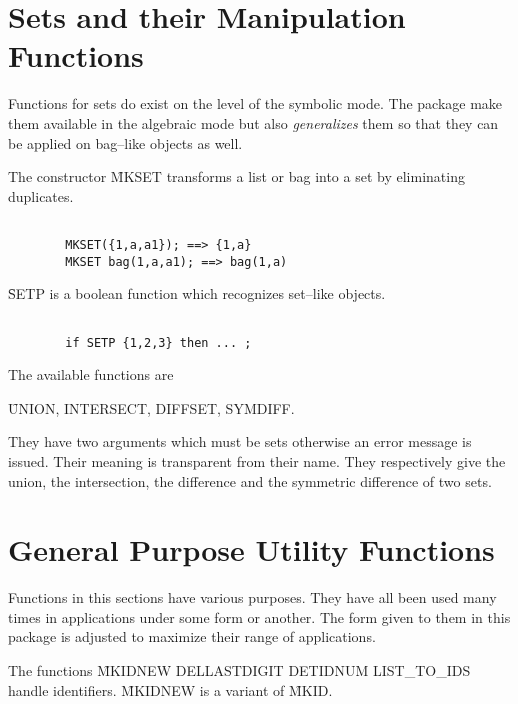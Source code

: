 \section{Sets and their Manipulation Functions}
Functions for sets do exist on the level of the symbolic mode. The
package make them available in the algebraic mode but also {\em generalizes}
them so that they can be applied on bag--like objects as well.
\bi
\item[i.]
The constructor \f{MKSET} transforms a list or bag into a set by eliminating
duplicates.
\begin{verbatim}

        MKSET({1,a,a1}); ==> {1,a}
        MKSET bag(1,a,a1); ==> bag(1,a)

\end{verbatim}

\f{SETP} is a boolean function which recognizes set--like objects.
\begin{verbatim}

        if SETP {1,2,3} then ... ;

\end{verbatim}
\item[ii.]
The available functions are
\begin{center}
\f{UNION, INTERSECT, DIFFSET, SYMDIFF}.
\end{center}
They have two arguments which must be sets otherwise an error message
is issued.
Their meaning is transparent from their name. They respectively give the
union, the intersection, the difference and the symmetric difference of two
sets.
\ei
\section{General Purpose Utility Functions}
Functions in this sections have various purposes. They have all been used
many times in applications under some form or another. The form given
to them in this package is adjusted to maximize their range of applications.
\bi
\item[i.]
The functions \f{MKIDNEW DELLASTDIGIT DETIDNUM LIST\_TO\_IDS}
handle identifiers. \f{MKIDNEW} is a  variant of \f{MKID}.

